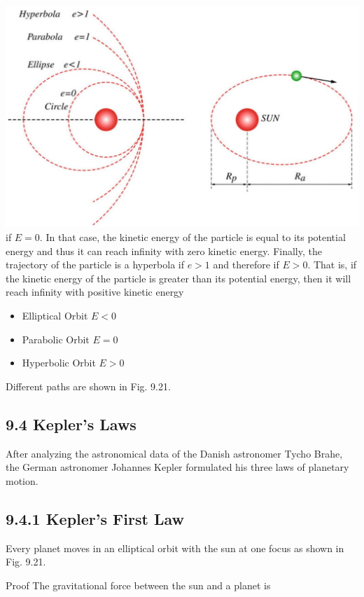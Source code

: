 \documentclass[10pt]{article}
\begin{document}
\includegraphics[max width=\textwidth, center]{2024_09_13_db1f357d2aad0a03eb2eg-156(1)}\\
if $E=0$. In that case, the kinetic energy of the particle is equal to its potential energy and thus it can reach infinity with zero kinetic energy. Finally, the trajectory of the particle is a hyperbola if $e>1$ and therefore if $E>0$. That is, if the kinetic energy of the particle is greater than its potential energy, then it will reach infinity with positive kinetic energy

\begin{itemize}
  \item Elliptical Orbit $E<0$
  \item Parabolic Orbit $E=0$
  \item Hyperbolic Orbit $E>0$
\end{itemize}

Different paths are shown in Fig. 9.21.

\subsection*{9.4 Kepler's Laws}
After analyzing the astronomical data of the Danish astronomer Tycho Brahe, the German astronomer Johannes Kepler formulated his three laws of planetary motion.

\subsection*{9.4.1 Kepler's First Law}
Every planet moves in an elliptical orbit with the sun at one focus as shown in Fig. 9.21.

Proof The gravitational force between the sun and a planet is
\end{document}
